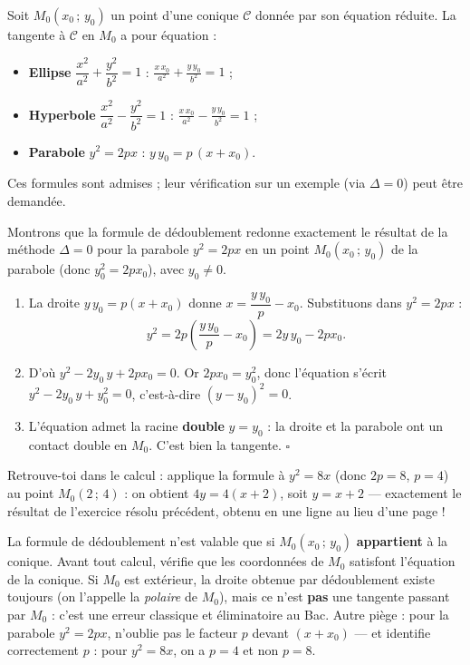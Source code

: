 \documentclass[11pt]{article}
\begin{document}
\begin{propriete}
Soit $M_0(x_0\,;\,y_0)$ un point d'une conique $\mathcal{C}$ donnée par son équation réduite. La tangente à $\mathcal{C}$ en $M_0$ a pour équation :
\begin{itemize}
\item \textbf{Ellipse} $\dfrac{x^2}{a^2} + \dfrac{y^2}{b^2} = 1$ : \quad $\displaystyle \frac{x\,x_0}{a^2} + \frac{y\,y_0}{b^2} = 1$ ;
\item \textbf{Hyperbole} $\dfrac{x^2}{a^2} - \dfrac{y^2}{b^2} = 1$ : \quad $\displaystyle \frac{x\,x_0}{a^2} - \frac{y\,y_0}{b^2} = 1$ ;
\item \textbf{Parabole} $y^2 = 2px$ : \quad $\displaystyle y\,y_0 = p\,(x + x_0)$.
\end{itemize}
Ces formules sont admises ; leur vérification sur un exemple (via $\Delta = 0$) peut être demandée.
\end{propriete}

\begin{experience}[Démonstration guidée sur un exemple : la parabole $y^2 = 2px$]
Montrons que la formule de dédoublement redonne exactement le résultat de la méthode $\Delta = 0$ pour la parabole $y^2 = 2px$ en un point $M_0(x_0\,;\,y_0)$ de la parabole (donc $y_0^2 = 2px_0$), avec $y_0 \neq 0$.
\begin{enumerate}
\item La droite $y\,y_0 = p(x + x_0)$ donne $x = \dfrac{y\,y_0}{p} - x_0$. Substituons dans $y^2 = 2px$ :
\[ y^2 = 2p\left(\frac{y\,y_0}{p} - x_0\right) = 2y\,y_0 - 2px_0. \]
\item D'où $y^2 - 2y_0\,y + 2px_0 = 0$. Or $2px_0 = y_0^2$, donc l'équation s'écrit $y^2 - 2y_0\,y + y_0^2 = 0$, c'est-à-dire $(y - y_0)^2 = 0$.
\item L'équation admet la racine \textbf{double} $y = y_0$ : la droite et la parabole ont un contact double en $M_0$. C'est bien la tangente. $\square$
\end{enumerate}
Retrouve-toi dans le calcul : applique la formule à $y^2 = 8x$ (donc $2p = 8$, $p = 4$) au point $M_0(2\,;\,4)$ : on obtient $4y = 4(x + 2)$, soit $y = x + 2$ — exactement le résultat de l'exercice résolu précédent, obtenu en une ligne au lieu d'une page !
\end{experience}

\begin{attention}
La formule de dédoublement n'est valable que si $M_0(x_0\,;\,y_0)$ \textbf{appartient} à la conique. Avant tout calcul, vérifie que les coordonnées de $M_0$ satisfont l'équation de la conique. Si $M_0$ est extérieur, la droite obtenue par dédoublement existe toujours (on l'appelle la \emph{polaire} de $M_0$), mais ce n'est \textbf{pas} une tangente passant par $M_0$ : c'est une erreur classique et éliminatoire au Bac. Autre piège : pour la parabole $y^2 = 2px$, n'oublie pas le facteur $p$ devant $(x + x_0)$ — et identifie correctement $p$ : pour $y^2 = 8x$, on a $p = 4$ et non $p = 8$.
\end{attention}
\end{document}
